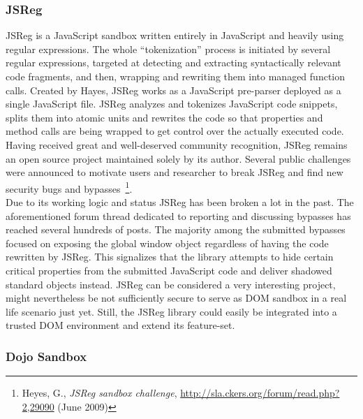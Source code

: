     \subsubsection{JSReg}
    \label{subsubsec:4.10.1.jsreg}

    JSReg is a JavaScript sandbox written entirely in JavaScript and heavily using regular expressions. The whole ``tokenization'' process is initiated by several regular expressions, targeted at detecting and extracting syntactically relevant code fragments, and then, wrapping and rewriting them into managed function calls. Created by Hayes, JSReg works as a JavaScript pre-parser deployed as a single JavaScript file. JSReg analyzes and tokenizes JavaScript code snippets, splits them into atomic units and rewrites the code so that properties and method calls are being wrapped to get control over the actually executed code. Having received great and well-deserved community recognition, JSReg remains an open source project maintained solely by its author. Several public challenges were announced to motivate users and researcher to break JSReg and find new security bugs and bypasses~\footnote{Heyes, G., \textit{JSReg sandbox challenge}, \url{http://sla.ckers.org/forum/read.php?2,29090} (June 2009)}.\\
    
    Due to its working logic and status JSReg has been broken a lot in the past. The aforementioned forum thread dedicated to reporting and discussing bypasses has reached several hundreds of posts. The majority among the submitted bypasses focused on exposing the global window object regardless of having the code rewritten by JSReg. This signalizes that the library attempts to hide certain critical properties from the submitted JavaScript code and deliver shadowed standard objects instead. JSReg can be considered a very interesting project, might nevertheless be not sufficiently secure to serve as DOM sandbox in a real life scenario just yet. Still, the JSReg library could easily be integrated into a trusted DOM environment and extend its feature-set.

    \subsubsection{Dojo Sandbox}
    \label{subsubsec:4.10.2.dojo_sandbox}


